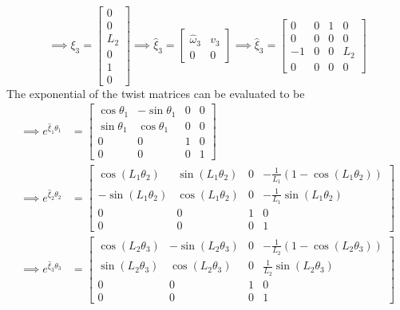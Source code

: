 \begin{equation*}
    \implies
    \xi_{3}
    =
    \begin{bmatrix}
        0   \\
        0   \\
        L_2 \\
        0   \\
        1   \\
        0
    \end{bmatrix}
    \implies
    \widehat{\xi}_{3}
    =
    \begin{bmatrix}
        \widehat{\omega}_{3} & v_3 \\
        0                    & 0
    \end{bmatrix}
    \implies
    \boxed{
        \widehat{\xi}_{3}
        =
        \begin{bmatrix}
            0  & 0 & 1 & 0   \\
            0  & 0 & 0 & 0   \\
            -1 & 0 & 0 & L_2 \\
            0  & 0 & 0 & 0
        \end{bmatrix}
    }
\end{equation*}
The exponential of the twist matrices can be evaluated to be
\begin{align*}
    \implies
    e^{\widehat{\xi}_{1} \theta_{1}}
     & =
    \begin{bmatrix}
        \cos \theta_{1} & -\sin \theta_{1} & 0 & 0 \\
        \sin \theta_{1} & \cos \theta_{1}  & 0 & 0 \\
        0               & 0                & 1 & 0 \\
        0               & 0                & 0 & 1
    \end{bmatrix}
    \\
    \implies
    e^{\widehat{\xi}_{2} \theta_{2}}
     & =
    \begin{bmatrix}
        \cos(L_1 \theta_2)  & \sin(L_1 \theta_2) & 0 & -\frac{1}{L_1} (1 - \cos(L_1 \theta_2)) \\
        -\sin(L_1 \theta_2) & \cos(L_1 \theta_2) & 0 & -\frac{1}{L_1} \sin(L_1 \theta_2)       \\
        0                   & 0                  & 1 & 0                                       \\
        0                   & 0                  & 0 & 1
    \end{bmatrix}
    \\
    \implies
    e^{\widehat{\xi}_{3} \theta_{3}}
     & =
    \begin{bmatrix}
        \cos(L_2 \theta_3) & -\sin(L_2 \theta_3) & 0 & -\frac{1}{L_2} (1 - \cos(L_2 \theta_3)) \\
        \sin(L_2 \theta_3) & \cos(L_2 \theta_3)  & 0 & \frac{1}{L_2} \sin(L_2 \theta_3)        \\
        0                  & 0                   & 1 & 0                                       \\
        0                  & 0                   & 0 & 1
    \end{bmatrix}
\end{align*}
